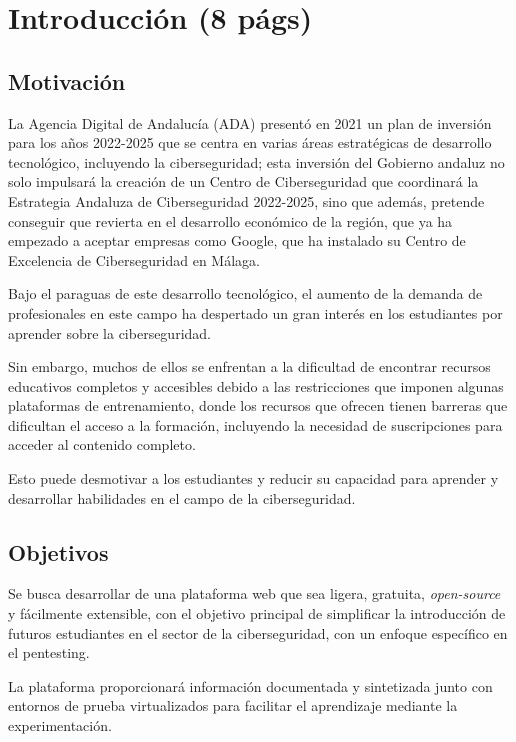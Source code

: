 \chapter{Introducción (8 págs)}

    \section{Motivación}
        
        La Agencia Digital de Andalucía (ADA) presentó en 2021 un plan de inversión para los años 2022-2025 que se centra en varias áreas estratégicas de desarrollo tecnológico, incluyendo la ciberseguridad; esta inversión del Gobierno andaluz no solo impulsará la creación de un Centro de Ciberseguridad que coordinará la Estrategia Andaluza de Ciberseguridad 2022-2025, sino que además, pretende conseguir que revierta en el desarrollo económico de la región, que ya ha empezado a aceptar empresas como Google, que ha instalado su Centro de Excelencia de Ciberseguridad en Málaga.
        
        Bajo el paraguas de este desarrollo tecnológico, el aumento de la demanda de profesionales en este campo ha despertado un gran interés en los estudiantes por aprender sobre la ciberseguridad.
        
        Sin embargo, muchos de ellos se enfrentan a la dificultad de encontrar recursos educativos completos y accesibles debido a las restricciones que imponen algunas plataformas de entrenamiento, donde los recursos que ofrecen tienen barreras que dificultan el acceso a la formación, incluyendo la necesidad de suscripciones para acceder al contenido completo.
        
        Esto puede desmotivar a los estudiantes y reducir su capacidad para aprender y desarrollar habilidades en el campo de la ciberseguridad.
    
    
    \section{Objetivos}
        \label{sec:objetivos}
    
        Se busca desarrollar de una plataforma web que sea ligera, gratuita, \textit{open-source} y fácilmente extensible, con el objetivo principal de simplificar la introducción de futuros estudiantes en el sector de la ciberseguridad, con un enfoque específico en el pentesting.
        
        La plataforma proporcionará información documentada y sintetizada junto con entornos de prueba virtualizados para facilitar el aprendizaje mediante la experimentación.
        
